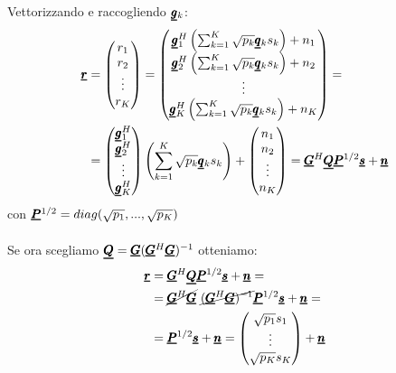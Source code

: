 Vettorizzando e raccogliendo $\pmb{\underline{g}}_k$:
\begin{equation*}
\begin{aligned}
    \pmb{\underline{r}} &= \begin{pmatrix}
    r_1 \\
    r_2 \\
    \vdots \\
    r_K
    \end{pmatrix} =
    \begin{pmatrix}
    \pmb{\underline{g}}_1^H \left(\sum_{k=1}^K \sqrt{p_k} \pmb{\underline{q}}_k s_k  \right) + n_1 \\
    \pmb{\underline{g}}_2^H \left(\sum_{k=1}^K \sqrt{p_k} \pmb{\underline{q}}_k s_k  \right) + n_2 \\
    \vdots \\
     \pmb{\underline{g}}_K^H \left(\sum_{k=1}^K \sqrt{p_k} \pmb{\underline{q}}_k s_k  \right) + n_K
     \end{pmatrix} = \\
     &= \begin{pmatrix}
      \pmb{\underline{g}}_1^H \\
      \pmb{\underline{g}}_2^H \\
      \vdots \\
      \pmb{\underline{g}}_K^H
     \end{pmatrix} 
     \left(\sum_{k=1}^K \sqrt{p_k} \pmb{\underline{q}}_k s_k  \right) + \begin{pmatrix}
     n_1 \\
     n_2 \\
     \vdots \\
     n_K
     \end{pmatrix} = \pmb{\underline{G}}^H \pmb{\underline{Q}} \pmb{\underline{P}}^{1/2}\pmb{\underline{s}} +\pmb{\underline{n}}
\end{aligned}
\end{equation*}
con $\pmb{\underline{P}}^{1/2} = diag(\sqrt{p_1},...,\sqrt{p_K})$\\ \\
Se ora scegliamo $\pmb{\underline{Q}} = \pmb{\underline{G}}(\pmb{\underline{G}}^H\pmb{\underline{G}})^{-1}$ otteniamo:
\begin{equation*}
    \begin{aligned}
        \vc{r} &=  \vc{G}^H \vc{Q} \vc{P}^{1/2}\vc{s} +\vc{n} = \\
        &= \cancel{\vc{G}^H \vc{G}} \ \cancel{(\vc{G}^H\vc{G})^{-1}}\vc{P}^{1/2}\vc{s} +\vc{n} = \\
        &=\vc{P}^{1/2}\vc{s} +\vc{n} = \begin{pmatrix}
        \sqrt{p_1}s_1 \\
        \vdots \\
        \sqrt{p_K}s_K
        \end{pmatrix}
        + \vc{n}
    \end{aligned}
\end{equation*}

